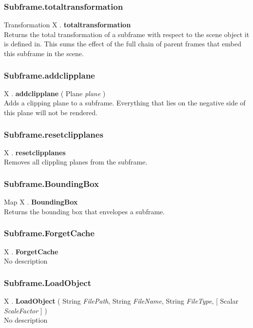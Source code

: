 \subsubsection{Subframe.totaltransformation \label{F:Subframe:totaltransformation}}
Transformation X . \textbf{totaltransformation} \\
Returns the total transformation of a subframe with respect to the scene object it is defined in. This sums the effect of the full chain of parent frames that embed this subframe in the scene.

\subsubsection{Subframe.addclipplane \label{F:Subframe:addclipplane}}
X . \textbf{addclipplane} ( Plane \textit{plane} ) \\
Adds a clipping plane to a subframe. Everything that lies on the negative side of this plane will not be rendered.

\subsubsection{Subframe.resetclipplanes \label{F:Subframe:resetclipplanes}}
X . \textbf{resetclipplanes} \\
Removes all clippling planes from the subframe.

\subsubsection{Subframe.BoundingBox \label{F:Subframe:BoundingBox}}
Map X . \textbf{BoundingBox} \\
Returns the bounding box that envelopes a subframe.

\subsubsection{Subframe.ForgetCache \label{F:Subframe:ForgetCache}}
X . \textbf{ForgetCache} \\
No description

\subsubsection{Subframe.LoadObject \label{F:Subframe:LoadObject}}
X . \textbf{LoadObject} ( String \textit{FilePath}, String \textit{FileName}, String \textit{FileType},  [ Scalar \textit{ScaleFactor} ] ) \\
No description

